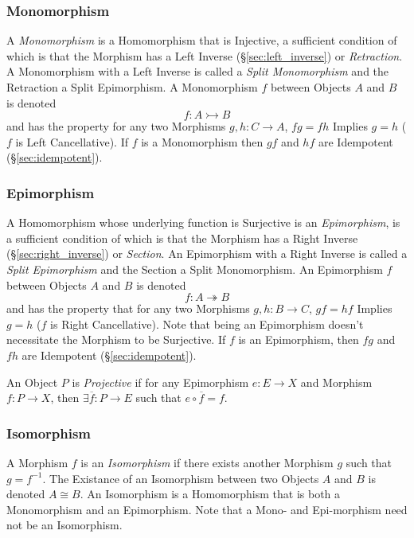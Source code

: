 \subsubsection{Monomorphism}\label{sec:monomorphism}

A \emph{Monomorphism} is a Homomorphism that is Injective, a
sufficient condition of which is that the Morphism has a Left Inverse
(\S\ref{sec:left_inverse}) or \emph{Retraction}. A Monomorphism with a
Left Inverse is called a \emph{Split Monomorphism} and the Retraction
a Split Epimorphism. A Monomorphism $f$ between Objects $A$ and $B$ is
denoted
\[
    f : A \rightarrowtail B
\]
and has the property for any two Morphisms $g, h : C \rightarrow A$,
$fg = fh$ Implies $g = h$ ($f$ is Left Cancellative). If $f$ is a
Monomorphism then $gf$ and $hf$ are Idempotent
(\S\ref{sec:idempotent}).



\subsubsection{Epimorphism}\label{sec:epimorphism}

A Homomorphism whose underlying function is Surjective is an
\emph{Epimorphism}, is a sufficient condition of which is that the
Morphism has a Right Inverse (\S\ref{sec:right_inverse}) or
\emph{Section}. An Epimorphism with a Right Inverse is called a
\emph{Split Epimorphism} and the Section a Split Monomorphism. An
Epimorphism $f$ between Objects $A$ and $B$ is denoted
\[
    f : A \twoheadrightarrow B
\]
and has the property that for any two Morphisms $g, h : B \rightarrow
C$, $gf = hf$ Implies $g = h$ ($f$ is Right Cancellative). Note that
being an Epimorphism doesn't necessitate the Morphism to be
Surjective. If $f$ is an Epimorphism, then $fg$ and $fh$ are
Idempotent (\S\ref{sec:idempotent}).

An Object $P$ is \emph{Projective} if for any Epimorphism $e : E
\rightarrow X$ and Morphism $f : P \rightarrow X$, then $\exists
\overline{f} : P \rightarrow E$ such that $e \circ \overline{f} = f$.



\subsubsection{Isomorphism}\label{sec:isomorphism}

A Morphism $f$ is an \emph{Isomorphism} if there exists another
Morphism $g$ such that $g = f^{-1}$. The Existance of an Isomorphism
between two Objects $A$ and $B$ is denoted $A \cong B$. An Isomorphism
is a Homomorphism that is both a Monomorphism and an Epimorphism. Note
that a Mono- and Epi-morphism need not be an Isomorphism.

